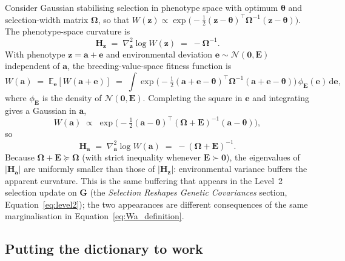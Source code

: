 \documentclass[9pt,twocolumn,twoside,lineno]{gsajnl}
\newcommand{\vect}[1]{\boldsymbol{#1}}
\newcommand{\mat}[1]{\mathbf{#1}}
\begin{document}
Consider Gaussian stabilising selection in phenotype space with optimum $\bm{\theta}$ and selection-width matrix $\bm{\Omega}$, so that $W(\vect{z}) \propto \exp\!\big(\!-\tfrac{1}{2}(\vect{z}-\bm{\theta})^{\top}\bm{\Omega}^{-1}(\vect{z}-\bm{\theta})\big)$. The phenotype-space curvature is
\[
\mat{H}_{\vect{z}} \;=\; \nabla^2_{\vect{z}}\log W(\vect{z}) \;=\; -\bm{\Omega}^{-1}.
\]
With phenotype $\vect{z} = \vect{a}+\vect{e}$ and environmental deviation $\vect{e}\sim\mathcal{N}(\vect{0},\mat{E})$ independent of $\vect{a}$, the breeding-value-space fitness function is
\[
W(\vect{a}) \;=\; \mathbb{E}_{\vect{e}}[W(\vect{a}+\vect{e})]
\;=\; \int \exp\!\big(\!-\tfrac{1}{2}(\vect{a}+\vect{e}-\bm{\theta})^{\top}\bm{\Omega}^{-1}(\vect{a}+\vect{e}-\bm{\theta})\big)\,\phi_{\mat{E}}(\vect{e})\,\mathrm{d}\vect{e},
\]
where $\phi_{\mat{E}}$ is the density of $\mathcal{N}(\vect{0},\mat{E})$. Completing the square in $\vect{e}$ and integrating gives a Gaussian in $\vect{a}$,
\[
W(\vect{a}) \;\propto\; \exp\!\Big(\!-\tfrac{1}{2}(\vect{a}-\bm{\theta})^{\top}(\bm{\Omega}+\mat{E})^{-1}(\vect{a}-\bm{\theta})\Big),
\]
so
\[
\mat{H}_{\vect{a}} \;=\; \nabla^2_{\vect{a}}\log W(\vect{a}) \;=\; -(\bm{\Omega}+\mat{E})^{-1}.
\]
Because $\bm{\Omega}+\mat{E}\succeq\bm{\Omega}$ (with strict inequality whenever $\mat{E}\succ\mat{0}$), the eigenvalues of $|\mat{H}_{\vect{a}}|$ are uniformly smaller than those of $|\mat{H}_{\vect{z}}|$: environmental variance buffers the apparent curvature. This is the same buffering that appears in the Level~2 selection update on $\mat{G}$ (the \textit{Selection Reshapes Genetic Covariances} section, Equation~\eqref{eq:level2}); the two appearances are different consequences of the same marginalisation in Equation~\eqref{eq:Wa_definition}.

\subsection{Putting the dictionary to work}
\end{document}
